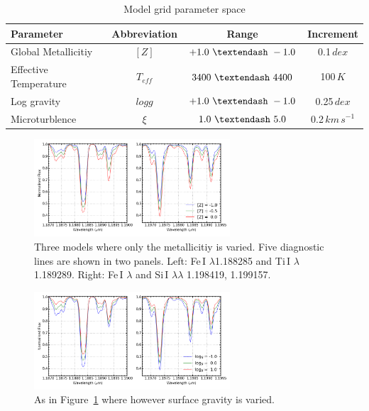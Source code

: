 \begin{table}
\caption{Model grid parameter space\label{tb:grid}}
\scriptsize
\begin{center}
\begin{tabular}{lccc}
 \hline
 \hline
Parameter & Abbreviation & Range & Increment \\
 \hline
Global Metallicitiy & $[Z]$ & $+1.0~\textendash~-1.0$ & 0.1\,$dex$ \\
Effective Temperature & $T_{eff}$ & $3400 ~ \textendash~4400$ & 100\,$K$ \\
Log gravity & $log g$ & $+1.0~ \textendash~-1.0$ & 0.25\,$dex$ \\
Microturblence & $\xi$ & $1.0~ \textendash~5.0$ & 0.2\,$km\,s^{-1}$ \\
 \hline
\end{tabular}
\end{center}
\end{table}


\begin{figure}
 \centering
\includegraphics[width=0.65\textwidth]{JAnal/varyZv2}
\caption{
Three models where only the metallicitiy is varied.
Five diagnostic lines are shown in two panels.
Left: Fe\,I $\lambda$1.188285 and Ti\,I $\lambda$ 1.189289.
Right: Fe\,I $\lambda$ and Si\,I $\lambda\lambda$ 1.198419, 1.199157.\label{fig:mod-z}
         }
\end{figure}

\begin{figure}
 \centering
\includegraphics[width=0.65\textwidth]{JAnal/varygv2}
\caption{
As in Figure~\ref{fig:mod-z} where however surface gravity is varied.\label{fig:mod-g}
         }
\end{figure}

